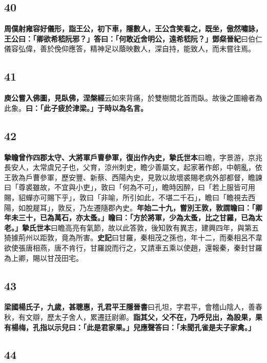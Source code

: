 \subsection*{40}

\textbf{周僕射雍容好儀形，詣王公，初下車，隱數人，王公含笑看之，既坐，傲然嘯詠，王公曰：「卿欲希嵇阮邪？」答曰：「何敢近舍明公，遠希嵇阮？」}{\footnotesize \textbf{鄧粲晉紀}曰伯仁儀容弘偉，善於俛仰應答，精神足以蔭映數人，深自持，能致人，而未嘗往焉。}

\subsection*{41}

\textbf{庾公嘗入佛圖，見臥佛，}{\footnotesize \textbf{涅槃經}云如來背痛，於雙樹間北首而臥。故後之圖繪者為此象。}\textbf{曰：「此子疲於津梁。」于時以為名言。}

\subsection*{42}

\textbf{摯瞻曾作四郡太守、大將軍戶曹參軍，復出作內史，}{\footnotesize \textbf{摯氏世本}曰瞻，字景游，京兆長安人，太常虞兄子也，父育，涼州刺史，瞻少善屬文，起家著作郎，中朝亂，依王敦為戶曹參軍，歷安豐、新蔡、西陽內史，見敦以故壞裘賜老病外部都督，瞻諫曰「尊裘雖故，不宜與小吏」，敦曰「何為不可」，瞻時因醉，曰「若上服皆可用賜，貂蟬亦可賜下乎」，敦曰「非喻，所引如此，不堪二千石」，瞻曰「瞻視去西陽，如脫屣耳」，敦反，乃左遷隨郡內史。}\textbf{年始二十九，嘗別王敦，敦謂瞻曰：「卿年未三十，已為萬石，亦太蚤。」瞻曰：「方於將軍，少為太蚤，比之甘羅，已為太老。」}{\footnotesize \textbf{摯氏世本}曰瞻高亮有氣節，故以此答敦，後知敦有異志，建興四年，與第五猗據荊州以距敦，竟為所害。\textbf{史記}曰甘羅，秦相茂之孫也，年十二，而秦相呂不韋欲使張唐相燕，唐不肯行，甘羅說而行之，又請車五乘以使趙，還報秦，秦封甘羅為上卿，賜以甘茂田宅。}

\subsection*{43}

\textbf{梁國楊氏子，九歲，甚聰惠，孔君平}{\footnotesize \textbf{王隱晉書}曰孔坦，字君平，會稽山陰人，善春秋，有文辯，歷太子舍人，累遷廷尉卿。}\textbf{詣其父，父不在，乃呼兒出，為設果，果有楊梅，孔指以示兒曰：「此是君家果。」兒應聲答曰：「未聞孔雀是夫子家禽。」}

\subsection*{44}

